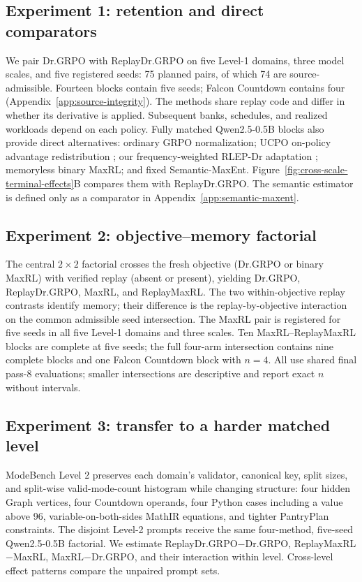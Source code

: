 \subsection{Experiment 1: retention and direct comparators}
\label{sec:retention-design}

We pair Dr.GRPO with ReplayDr.GRPO on five Level-1
domains, three model scales, and five registered seeds: 75 planned pairs, of
which 74 are source-admissible. Fourteen blocks contain five seeds; Falcon
Countdown contains four (Appendix~\ref{app:source-integrity}). The methods
share replay code and differ in whether its derivative is applied. Subsequent
banks, schedules, and realized workloads depend on each policy. Fully matched
Qwen2.5-0.5B blocks also provide direct alternatives: ordinary GRPO
normalization; UCPO on-policy advantage redistribution
\citep{lochab2026ucpo}; our frequency-weighted RLEP-Dr adaptation
\citep{zhang2025rlep}; memoryless binary MaxRL; and fixed Semantic-MaxEnt.
Figure~\ref{fig:cross-scale-terminal-effects}B compares them with
ReplayDr.GRPO. The semantic estimator is defined only as a comparator in
Appendix~\ref{app:semantic-maxent}.

\subsection{Experiment 2: objective--memory factorial}
\label{sec:factorial-design}

The central \(2\times2\) factorial crosses the fresh
objective (Dr.GRPO or binary MaxRL) with verified replay (absent or present),
yielding Dr.GRPO, ReplayDr.GRPO, MaxRL, and ReplayMaxRL. The two
within-objective replay contrasts identify memory; their difference is the
replay-by-objective interaction on the common admissible seed intersection.
The MaxRL pair is registered for five seeds in all five Level-1 domains and
three scales. Ten MaxRL--ReplayMaxRL blocks are complete at five seeds; the
full four-arm intersection contains nine complete blocks and one Falcon
Countdown block with \(n=4\). All use shared final pass-8 evaluations; smaller
intersections are descriptive and report exact \(n\) without intervals.

\subsection{Experiment 3: transfer to a harder matched level}
\label{sec:levels-design}

ModeBench Level 2 preserves each domain's validator,
canonical key, split sizes, and split-wise valid-mode-count histogram while
changing structure: four hidden Graph vertices, four Countdown operands, four
Python cases including a value above 96, variable-on-both-sides MathIR
equations, and tighter PantryPlan constraints. The disjoint Level-2 prompts receive the same four-method,
five-seed Qwen2.5-0.5B factorial. We estimate
ReplayDr.GRPO\(-\)Dr.GRPO, ReplayMaxRL\(-\)MaxRL,
MaxRL\(-\)Dr.GRPO, and their interaction within level. Cross-level effect
patterns compare the unpaired prompt sets.



